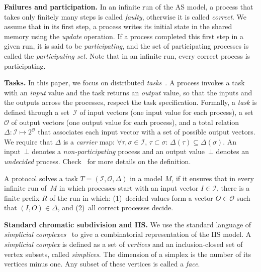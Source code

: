 \documentclass[a4paper]{article}
\newcommand{\myparagraph}[1]{\vspace{6pt}\noindent \textbf{#1}}
\newcommand{\remove}[1]{}
\def\I{\ensuremath{\mathcal{I}}}
\def\O{\ensuremath{\mathcal{O}}}
\def\O {\mathcal{O}}
\def\I {\mathcal{I}}
\begin{document}
\myparagraph{Failures and participation.}
%
In an infinite run of the AS model,
a process that takes only  finitely many steps
is called \emph{faulty}, otherwise it is called 
\emph{correct}. We assume that in its first step, a process 
writes its initial state in the shared memory using the \emph{update} operation. If a process 
completed this first step in a given run, it is said to be
\emph{participating}, and the set of participating processes is called
the \emph{participating set}.
Note that in an infinite run, every correct process is participating.

\remove{
In contrast, the IIS model does not have the notion of a faulty 
process. Instead, a process may appear 
``slow''~\cite{RS12,Gaf98-iis,BGK14}, i.e., be late in accessing 
iterated memories from some point on so that some ``faster'' 
processes do not see them. 
}

\myparagraph{Tasks.}
%
In this paper, we focus on distributed \emph{tasks}~\cite{HS99}. 
A process invokes a task with an \emph{input} value and the task 
returns an \emph{output} value, so that the inputs and the outputs 
across the processes, respect the task 
specification.
Formally, a \emph{task} is defined through a set~$\I$ of input 
vectors (one input value for each process), a set~$\O$ of output 
vectors (one output value for each process), and a total 
relation~$\Delta:\I\mapsto 2^{\O}$ that associates each input 
vector with a set of possible output vectors.
We require that $\Delta$ is a \emph{carrier} map: $\forall \tau,\sigma
\in \I$, $\tau\subset\sigma$: $\Delta(\tau)\subseteq \Delta(\sigma)$.  
An input~$\bot$  denotes a \emph{non-participating} process and an output 
value~$\bot$ denotes an \emph{undecided} process. 
Check~\cite{HKR14} for more details on the definition.

A protocol solves a task $T=(\I,\O,\Delta)$ in a model $M$, 
if it ensures that in every infinite run of~$M$ in which 
processes start with an input vector $I\in\I$, there is a finite
prefix $R$ of the run in which: (1)~decided values form a 
vector $O\in\O$ such that $(I,O)\in\Delta$, and (2)~all 
correct processes decide. 

\myparagraph{Standard chromatic subdivision and IIS.}
%
We use the standard language of \emph{simplicial
  complexes}~\cite{Spanier,HKR14} to give a combinatorial
representation of the IIS model. 
A \emph{simplicial complex} is defined as a set of 
\emph{vertices} and an inclusion-closed set of vertex subsets, 
called \emph{simplices}. The dimension of a simplex is 
the number of its vertices minus one. Any subset of these 
vertices is called a \emph{face}. 
\end{document}
